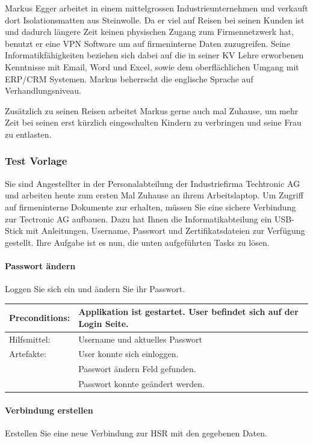 Markus Egger arbeitet in einem mittelgrossen Industrieunternehmen und verkauft dort Isolationsmatten aus Steinwolle. Da er viel auf Reisen bei seinen Kunden ist und dadurch längere Zeit keinen physischen Zugang zum Firmennetzwerk hat, benutzt er eine VPN Software um auf firmeninterne Daten zuzugreifen. Seine Informatikfähigkeiten beziehen sich dabei auf die in seiner KV Lehre erworbenen Kenntnisse mit Email, Word und Excel, sowie dem oberflächlichen Umgang mit ERP/CRM Systemen.
Markus beherrscht die englische Sprache auf Verhandlungsniveau.

Zusätzlich zu seinen Reisen arbeitet Markus gerne auch mal Zuhause, um mehr Zeit bei seinen erst kürzlich eingeschulten Kindern zu verbringen und seine Frau zu entlasten.

\subsubsection{Test Vorlage}


Sie sind Angestellter in der Personalabteilung der Industriefirma Techtronic AG und arbeiten heute zum ersten Mal Zuhause an ihrem Arbeitslaptop. Um Zugriff auf firmeninterne Dokumente zur erhalten, müssen Sie eine sichere Verbindung zur Tectronic AG aufbauen. Dazu hat Ihnen die Informatikabteilung ein USB-Stick mit Anleitungen, Username, Passwort und Zertifikatsdateien zur Verfügung gestellt. Ihre Aufgabe ist es nun, die unten aufgeführten Tasks zu lösen.

\paragraph{Passwort ändern}
Loggen Sie sich ein und ändern Sie ihr Passwort. \\


\begin{tabular}{ | p{} | p{} | }
\hline
Preconditions: & Applikation ist gestartet. User befindet sich auf der Login Seite. \\
\hline
Hilfsmittel: & Username und aktuelles Passwort \\
\hline
Artefakte: & User konnte sich einloggen. \\ 
& Passwort ändern Feld gefunden. \\
& Passwort konnte geändert werden. \\
\hline
\end{tabular}

\paragraph{Verbindung erstellen}
Erstellen Sie eine neue Verbindung zur HSR mit den gegebenen Daten. \\


